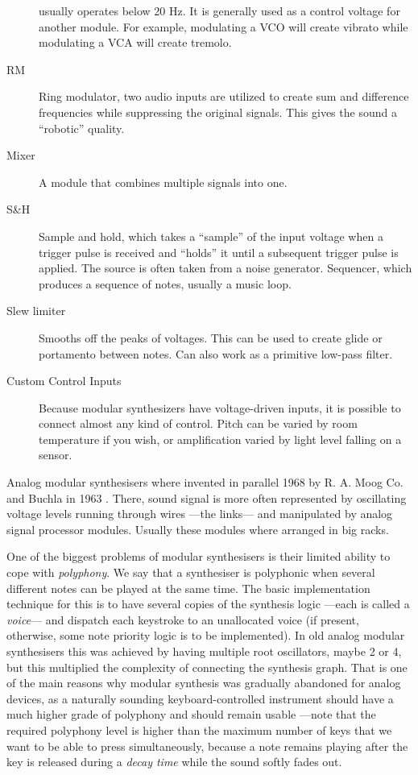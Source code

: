 \begin{mynote}
\begin{description}
    usually operates below 20 Hz. It is generally used as a control
    voltage for another module. For example, modulating a VCO will
    create vibrato while modulating a VCA will create tremolo.
  \item[RM] Ring modulator, two audio inputs are utilized to create
    sum and difference frequencies while suppressing the original
    signals. This gives the sound a ``robotic'' quality.
  \item[Mixer] A module that combines multiple signals into one.
  \item[S\&H] Sample and hold, which takes a ``sample'' of the input
    voltage when a trigger pulse is received and ``holds'' it until a
    subsequent trigger pulse is applied. The source is often taken
    from a noise generator.  Sequencer, which produces a sequence of
    notes, usually a music loop.
  \item[Slew limiter] Smooths off the peaks of voltages. This can be
    used to create glide or portamento between notes. Can also work
    as a primitive low-pass filter.
  \item[Custom Control Inputs] Because modular synthesizers have
    voltage-driven inputs, it is possible to connect almost any kind
    of control. Pitch can be varied by room temperature if you wish,
    or amplification varied by light level falling on a sensor.
  \end{description}
\end{mynote}

Analog modular synthesisers where invented in parallel 1968 by
R. A. Moog Co. and Buchla in 1963 \cite{moog1964voltage}. There, sound
signal is more often represented by oscillating voltage levels running
through wires ---the links--- and manipulated by analog signal processor
modules. Usually these modules where arranged in big racks.

One of the biggest problems of modular synthesisers is their limited
ability to cope with \emph{polyphony}. We say that a synthesiser is
polyphonic when several different notes can be played at the same
time. The basic implementation technique for this is to have several
copies of the synthesis logic ---each is called a \emph{voice}--- and
dispatch each keystroke to an unallocated voice (if present,
otherwise, some note priority logic is to be implemented). In old
analog modular synthesisers this was achieved by having multiple root
oscillators, maybe 2 or 4, but this multiplied the complexity of
connecting the synthesis graph. That is one of the main reasons why
modular synthesis was gradually abandoned for analog devices, as a
naturally sounding keyboard-controlled instrument should have a much
higher grade of polyphony and should remain usable ---note that the
required polyphony level is higher than the maximum number of keys that
we want to be able to press simultaneously, because a note remains
playing after the key is released during a \emph{decay time} while the
sound softly fades out.


